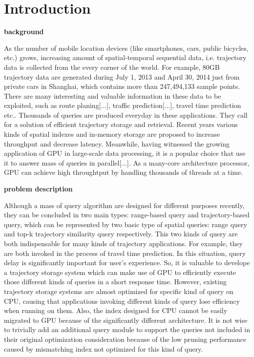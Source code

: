 \documentclass[conference]{IEEEtran}
\begin{document}
\section{Introduction}
	\textbf{background}
	
	As the number of mobile location devices (like smartphones, cars, public bicycles, etc.) grows, increasing amount of spatial-temporal sequential data, i.e. trajectory data is collected from the every corner of the world. For example, 80GB trajectory data are generated during July 1, 2013 and April 30, 2014 just from private cars in Shanghai, which contains more than 247,494,133 sample points. There are many interesting and valuable information in these data to be exploited, such as route planing[...], traffic prediction[...], travel time prediction\cite{DBLP:conf/gis/LeeSCC12} etc.. Thousands of queries are produced everyday in these applications. They call for a solution of efficient trajectory storage and retrieval. Recent years various kinds of spatial indexes and in-memory storage are proposed to increase throughput and decrease latency. Meanwhile, having witnessed the growing application of GPU in large-scale data processing, it is a popular choice that use it to answer mass of queries in parallel\cite{7498315}[...]. As a many-core architecture processor, GPU can achieve high throughtput by handling thousands of threads at a time.
	
	\textbf{problem description}
	
	Although a mass of query algorithm are designed for different purposes recently, they can be concluded in two main types: range-based query and trajectory-based query, which can be represented by two basic type of spatial queries: range query and top-k trajectory similarity query respectively.\cite{DBLP:journals/tist/Zheng15} This two kinds of query are both indispensable for many kinds of trajectory applications. For example, they are both invoked in the process of travel time prediction\cite{DBLP:conf/gis/LeeSCC12}. In this situation, query delay is significantly important for user's experience. So, it is valuable to develope a trajectory storage system which can make use of GPU to efficiently execute those different kinds of queries in a short response time. However, existing trajectory storage systems are almost optimized for specific kind of query on CPU, causing that applications invoking different kinds of query lose efficiency when running on them. Also, the index designed for CPU cannot be easily migrated to GPU because of the significantly different architecture. It is not wise to trivially add an additional query module to support the queries not included in their original optimization consideration because of the low pruning performance caused by mismatching index not optimized for this kind of query. 
	
\end{document}
